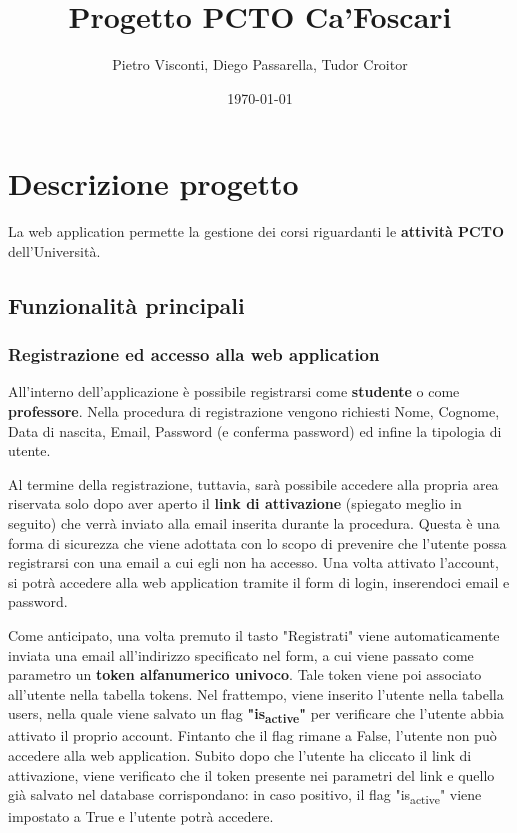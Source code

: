 \documentclass[11pt]{article}
\author{Pietro Visconti, Diego Passarella, Tudor Croitor}
\date{\today}
\title{Progetto PCTO Ca'Foscari}
\begin{document}
\maketitle
\tableofcontents


\section{Descrizione progetto}
\label{sec:orga97862f}
La web application permette la gestione dei corsi riguardanti le \textbf{attività PCTO} dell'Università.

\subsection{Funzionalità principali}
\label{sec:org36f7484}

\subsubsection{Registrazione ed accesso alla web application}
\label{sec:org2b92bdb}
All'interno dell'applicazione è possibile registrarsi come \textbf{studente} o come \textbf{professore}.
Nella procedura di registrazione vengono richiesti Nome, Cognome, Data di nascita, Email, Password (e conferma password) ed infine la tipologia di utente.

Al termine della registrazione, tuttavia, sarà possibile accedere alla propria area riservata solo dopo aver aperto il \textbf{link di attivazione} (spiegato meglio in seguito) che verrà inviato alla email inserita durante la procedura. Questa è una forma di sicurezza che viene adottata con lo scopo di prevenire che l'utente possa registrarsi con una email a cui egli non ha accesso. Una volta attivato l'account, si potrà accedere alla web application tramite il form di login, inserendoci email e password.

Come anticipato, una volta premuto il tasto "Registrati" viene automaticamente inviata una email all'indirizzo specificato nel form, a cui viene passato come parametro un \textbf{token alfanumerico univoco}. Tale token viene poi associato all'utente nella tabella tokens. Nel frattempo, viene inserito l'utente nella tabella users, nella quale viene salvato un flag \textbf{"is\textsubscript{active}"} per verificare che l'utente abbia attivato il proprio account. Fintanto che il flag rimane a False, l'utente non può accedere alla web application. Subito dopo che l'utente ha cliccato il link di attivazione, viene verificato che il token presente nei parametri del link e quello già salvato nel database corrispondano: in caso positivo, il flag "is\textsubscript{active}" viene impostato a True e l'utente potrà accedere.
\end{document}
